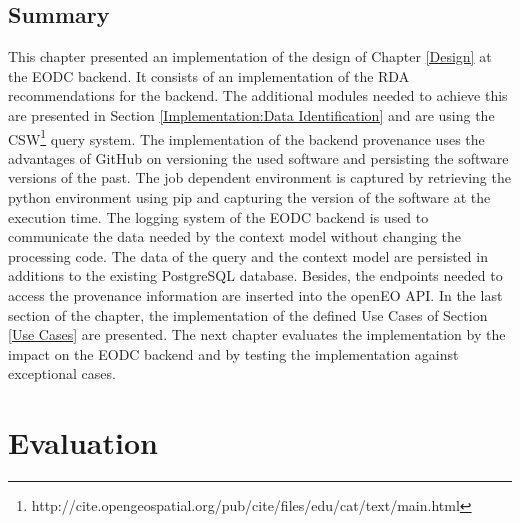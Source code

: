 \documentclass[draft,final]{vutinfth} %
\begin{document}
\section{Summary}
This chapter presented an implementation of the design of Chapter \ref{Design} at the EODC backend. It consists of an implementation of the RDA recommendations for the backend. The additional modules needed to achieve this are presented in Section \ref{Implementation:Data Identification} and are using the CSW\footnote{http://cite.opengeospatial.org/pub/cite/files/edu/cat/text/main.html} query system. The implementation of the backend provenance uses the advantages of GitHub on versioning the used software and persisting the software versions of the past. The job dependent environment is captured by retrieving the python environment using pip and capturing the version of the software at the execution time. The logging system of the EODC backend is used to communicate the data needed by the context model without changing the processing code. The data of the query and the context model are persisted in additions to the existing PostgreSQL database. Besides, the endpoints needed to access the provenance information are inserted into the openEO API. In the last section of the chapter, the implementation of the defined Use Cases of Section \ref{Use Cases} are presented. The next chapter evaluates the implementation by the impact on the EODC backend and by testing the implementation against exceptional cases.   

\chapter{Evaluation}\label{Evaluation}
\end{document}
